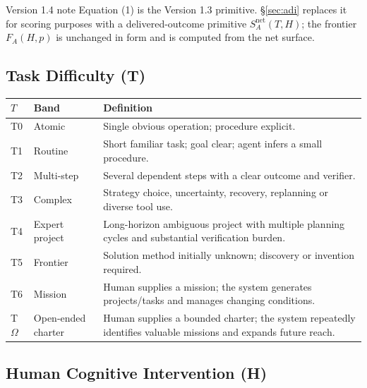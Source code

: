 \documentclass[11pt]{article}
\theoremstyle{definition}
\newcommand{\Om}{\ensuremath{\Omega}}
\newcommand{\FA}{\ensuremath{F_A(H,p)}}
\begin{document}
\begin{addedbox}{Version 1.4 note}
Equation (1) is the Version 1.3 primitive. \S\ref{sec:adi} replaces it for scoring purposes with a delivered-outcome primitive $S^{\text{net}}_A(T,H)$; the frontier \FA{} is unchanged in form and is computed from the net surface.
\end{addedbox}

\subsection{Task Difficulty (T)}

\begin{table}[h]
\centering\small
\begin{tabularx}{\textwidth}{@{}llY@{}}
\toprule
$T$ & Band & Definition \\
\midrule
T0 & Atomic & Single obvious operation; procedure explicit. \\
T1 & Routine & Short familiar task; goal clear; agent infers a small procedure. \\
T2 & Multi-step & Several dependent steps with a clear outcome and verifier. \\
T3 & Complex & Strategy choice, uncertainty, recovery, replanning or diverse tool use. \\
T4 & Expert project & Long-horizon ambiguous project with multiple planning cycles and substantial verification burden. \\
T5 & Frontier & Solution method initially unknown; discovery or invention required. \\
T6 & Mission & Human supplies a mission; the system generates projects/tasks and manages changing conditions. \\
T\Om{} & Open-ended charter & Human supplies a bounded charter; the system repeatedly identifies valuable missions and expands future reach. \\
\bottomrule
\end{tabularx}
\end{table}

\subsection{Human Cognitive Intervention (H)}
\end{document}

